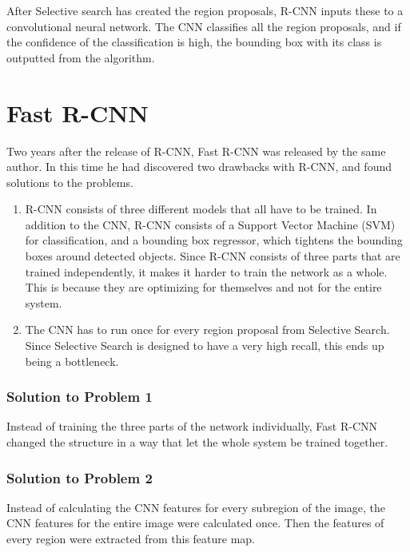 \newpage

After Selective search has created the region proposals, R-CNN inputs these to a convolutional neural network. The CNN classifies all the region proposals, and if the confidence of the classification is high, the bounding box with its class is outputted from the algorithm. 


\section{Fast R-CNN}

Two years after the release of R-CNN, Fast R-CNN  \citep{FastR-CNN} was released by the same author. In this time he had discovered two drawbacks with R-CNN, and found solutions to the problems. 

\begin{enumerate}
    \item R-CNN consists of three different models that all have to be trained. In addition to the CNN, R-CNN consists of a Support Vector Machine (SVM) for classification, and a bounding box regressor, which tightens the bounding boxes around detected objects. Since R-CNN consists of three parts that are trained independently, it makes it harder to train the network as a whole. This is because they are optimizing for themselves and not for the entire system. 
    \item The CNN has to run once for every region proposal from Selective Search. Since Selective Search is designed to have a very high recall, this ends up being a bottleneck. 
\end{enumerate}

\subsubsection{Solution to Problem 1}
Instead of training the three parts of the network individually, Fast R-CNN changed the structure in a way that let the whole system be trained together.

\subsubsection{Solution to Problem 2}
Instead of calculating the CNN features for every subregion of the image, the CNN features for the entire image were calculated once. Then the features of every region were extracted from this feature map.



